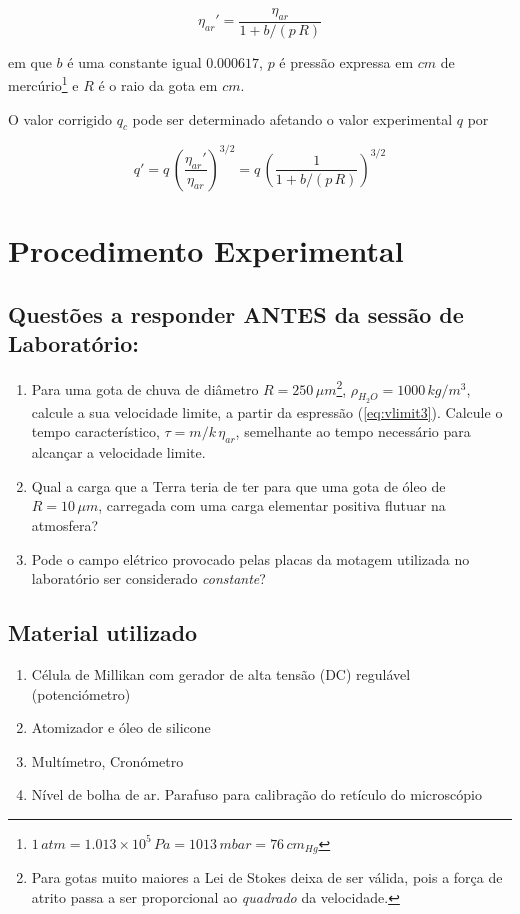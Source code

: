 \documentclass[a4paper,twoside,12pt]{article}      %
\begin{document}
\begin{multicols}{2}
\begin{equation}
	\label{eq:correcao}
	\eta_{ar}' = \frac{\eta_{ar}}{1 + b/(p\,R)}  
\end{equation}

em que $b$ é uma constante igual $0.000617$, $p$ é pressão expressa em $cm$ de mercúrio\footnote{$1\,atm  = 1.013 \times 10^5 \,Pa = 1013 \, mbar = 76\, cm_{Hg}$}  e $R$ é o raio da gota em $cm$.

O valor corrigido $q_c$ pode ser determinado afetando o valor experimental $q$ por

\begin{equation}
	\label{eq:correcao1}
	q ' = q\, \left(\frac{\eta_{ar}'}{\eta_{ar}}\right)^{3/2}  =q\, \left(\frac{1}{1 + b/(p\,R)}\right)^{3/2}  
\end{equation}

\newpage
\section{\sf Procedimento Experimental}

\subsection{\sf Questões a responder ANTES da sessão de Laboratório:}
\begin{enumerate}
\item Para uma gota de chuva de diâmetro $R = 250\,\mu m$\footnote{Para gotas muito maiores a Lei de Stokes deixa de ser válida, pois a força de atrito passa a ser proporcional ao \emph{quadrado} da velocidade.}, $\rho_{H_2 O} = 1000 \, kg/m^{3}$, calcule a sua velocidade limite, a partir da espressão (\ref{eq:vlimit3}). Calcule o tempo característico, $\tau=m/k\,\eta_{ar}$, semelhante ao tempo necessário para alcançar a velocidade limite.
\item Qual a carga que a Terra teria de ter para que uma gota de óleo de $R = 10\,\mu m$, carregada com uma carga elementar positiva flutuar na atmosfera?
\item Pode o campo elétrico provocado pelas placas da motagem utilizada no laboratório ser considerado \emph{constante}?
\end{enumerate}

\subsection{\sf Material utilizado}

\begin{enumerate}
	\item Célula de Millikan com gerador de alta tensão (DC) regulável (potenciómetro) 
	\item  Atomizador e óleo de silicone 
	\item Multímetro, Cronómetro 
	\item Nível de bolha de ar. Parafuso para calibração do retículo do microscópio
\end{enumerate}

\end{multicols}
\end{document}
